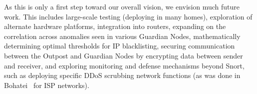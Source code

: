As this is only a first step toward our overall vision, we envision much future work.
This includes large-scale testing (deploying in many homes), exploration of alternate hardware platforms, integration into routers, expanding on the correlation across anomalies seen in various Guardian Nodes, mathematically determining optimal thresholds for IP blacklisting, securing communication between the Outpost and Guardian Nodes by encrypting data between sender and receiver, and exploring 
monitoring and defense mechanisms beyond Snort, such as deploying specific DDoS scrubbing network functions (as was done in Bohatei~\cite{bohatei} for ISP networks).

%
%

